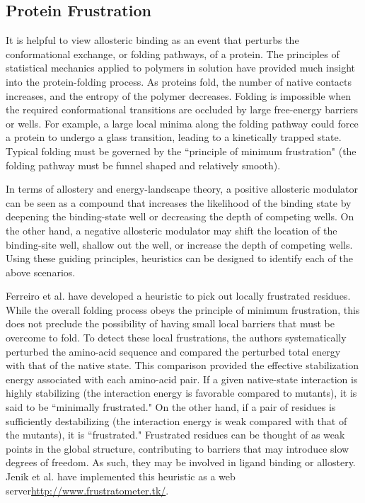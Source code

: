 \subsection{Protein Frustration}
\par It is helpful to view allosteric binding as an event that perturbs the conformational exchange, or folding pathways, of a protein. The principles of statistical mechanics applied to polymers in solution have provided much insight into the protein-folding process. As proteins fold, the number of native contacts increases, and the entropy of the polymer decreases. Folding is impossible when the required conformational transitions are occluded by large free-energy barriers or wells. For example, a large local minima along the folding pathway could force a protein to undergo a glass transition, leading to a kinetically trapped state. Typical folding must be governed by the ``principle of minimum frustration" (\ie the folding pathway must be funnel shaped and relatively smooth). \cite{Bryngelson1987,Wolynes1995,Onuchic1996,Onuchic1997b,Wolynes2005,Karplus2011}
\par In terms of allostery and energy-landscape theory, a positive allosteric modulator can be seen as a compound that increases the likelihood of the binding state by deepening the binding-state well or decreasing the depth of competing wells. On the other hand, a negative allosteric modulator may shift the location of the binding-site well, shallow out the well, or increase the depth of competing wells. Using these guiding principles, heuristics can be designed to identify each of the above scenarios.
\par Ferreiro et al. have developed a heuristic to pick out locally frustrated residues.\cite{Ferreiro2007a,Ferreiro2011a} While the overall folding process obeys the principle of minimum frustration, this does not preclude the possibility of having small local barriers that must be overcome to fold. To detect these local frustrations, the authors systematically perturbed the amino-acid sequence and compared the perturbed total energy with that of the native state. This comparison provided the effective stabilization energy associated with each amino-acid pair. If a given native-state interaction is highly stabilizing (\ie the interaction energy is favorable compared to mutants), it is said to be ``minimally frustrated." On the other hand, if a pair of residues is sufficiently destabilizing (\ie the interaction energy is weak compared with that of the mutants), it is ``frustrated." Frustrated residues can be thought of as weak points in the global structure, contributing to barriers that may introduce slow degrees of freedom. As such, they may be involved in ligand binding or allostery. Jenik et al. have implemented this heuristic as a web server\url{http://www.frustratometer.tk/}.\cite{Jenik2012}

